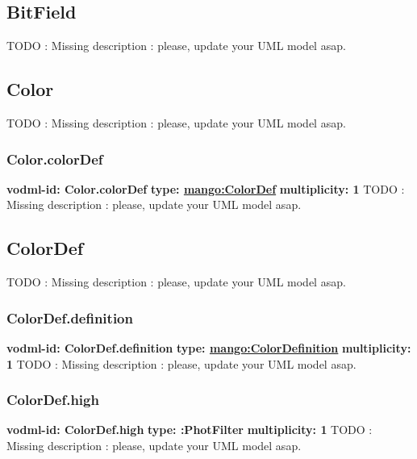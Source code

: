   \subsection{BitField}
  \label{sect:BitField}
    TODO : Missing description : please, update your UML model asap.

  \subsection{Color}
  \label{sect:Color}
    TODO : Missing description : please, update your UML model asap.

    \subsubsection{Color.colorDef}
      \textbf{vodml-id: Color.colorDef} \newline
      \textbf{type: \hyperref[sect:ColorDef]{mango:ColorDef}} \newline
      \textbf{multiplicity: 1} \newline 
      TODO : Missing description : please, update your UML model asap.

  \subsection{ColorDef}
  \label{sect:ColorDef}
    TODO : Missing description : please, update your UML model asap.

    \subsubsection{ColorDef.definition}
      \textbf{vodml-id: ColorDef.definition} \newline
      \textbf{type: \hyperref[sect:ColorDefinition]{mango:ColorDefinition}} \newline
      \textbf{multiplicity: 1} \newline 
      TODO : Missing description : please, update your UML model asap.

    \subsubsection{ColorDef.high}
      \textbf{vodml-id: ColorDef.high} \newline
      \textbf{type: :PhotFilter} \newline
      \textbf{multiplicity: 1} \newline 
      TODO : Missing description : please, update your UML model asap.

